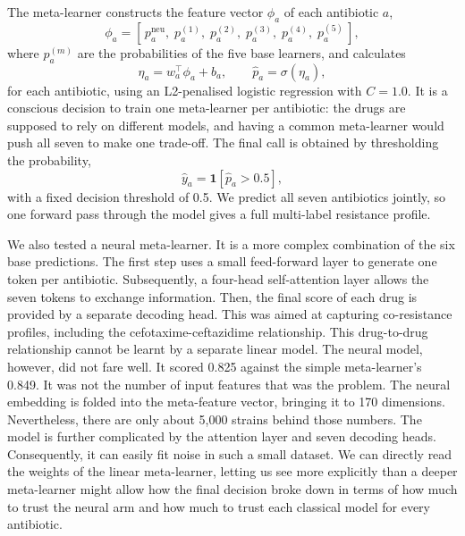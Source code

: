 \documentclass[journal]{IEEEtran}
\begin{document}
The meta-learner constructs the feature vector $\phi_a$ of each antibiotic $a$,
\begin{equation}
\phi_a = \left[\,p^{\mathrm{neu}}_a,\; p^{(1)}_a,\; p^{(2)}_a,\; p^{(3)}_a,\; p^{(4)}_a,\; p^{(5)}_a\,\right],
\label{eq:meta_features}
\end{equation}
where $p^{(m)}_a$ are the probabilities of the five base learners, and calculates
\begin{equation}
\eta_a = w_a^\top \phi_a + b_a,
\qquad
\hat{p}_a = \sigma(\eta_a),
\label{eq:meta_logit}
\end{equation}
for each antibiotic, using an L2-penalised logistic regression with $C = 1.0$. It is
a conscious decision to train one meta-learner per antibiotic: the drugs are supposed
to rely on different models, and having a common meta-learner would push all seven to
make one trade-off. The final call is obtained by thresholding the probability,
\begin{equation}
\hat{y}_a = \mathbf{1}\!\left[\hat{p}_a > 0.5\right],
\label{eq:decision}
\end{equation}
with a fixed decision threshold of 0.5. We predict all seven antibiotics jointly, so
one forward pass through the model gives a full multi-label resistance profile.

We also tested a neural meta-learner. It is a more complex combination of the six
base predictions. The first step uses a small feed-forward layer to generate one
token per antibiotic. Subsequently, a four-head self-attention layer allows the seven
tokens to exchange information. Then, the final score of each drug is provided by a
separate decoding head. This was aimed at capturing co-resistance profiles, including
the cefotaxime-ceftazidime relationship. This drug-to-drug relationship cannot be
learnt by a separate linear model. The neural model, however, did not fare well. It
scored 0.825 against the simple meta-learner's 0.849. It was not the number of input
features that was the problem. The neural embedding is folded into the meta-feature
vector, bringing it to 170 dimensions. Nevertheless, there are only about 5{,}000
strains behind those numbers. The model is further complicated by the attention layer
and seven decoding heads. Consequently, it can easily fit noise in such a small
dataset. We can directly read the weights of the linear meta-learner, letting us see
more explicitly than a deeper meta-learner might allow how the final decision broke
down in terms of how much to trust the neural arm and how much to trust each
classical model for every antibiotic.
\end{document}
